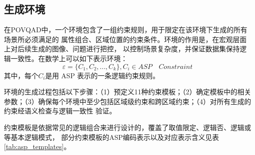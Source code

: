 \subsection{生成环境}
在POVQAD中，一个环境包含了一组约束规则，用于限定在该环境下生成的所有场景所必须满足的
属性组合、区域位置的约束条件。环境的作用是，在宏观层面上对后续生成的图像、问题进行把控，
以控制场景复杂度，并保证数据集保持逻辑一致性。在数学上可以如下表示环境：
$$ \varepsilon = \{C_1,C_2, ..., C_k \}, C_i \in ASP \quad Constraint $$
其中，每个$C_i$是用 ASP 表示的一条逻辑约束规则。

环境的生成过程包括以下步骤：（1）预定义11种约束模板；（2）确定模板中的相关参数；（3）确保每个环境中至少包括区域级约束和跨区域约束；（4）对所有生成的约束经语义检查与逻辑一致性
验证。

约束模板是依据常见的逻辑组合来进行设计的，覆盖了取值限定、逻辑否、逻辑或等基本逻辑模式，
部分约束模板的ASP编码表示以及对应表示含义见表\ref{tab:asp_templates}。

